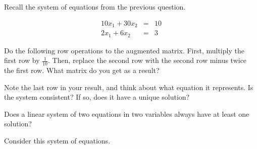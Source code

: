





Recall the system of equations from the previous question.  



\begin{eqnarray*}
10x_1 + 30x_2 & = & 10 \\
2x_1 + 6x_2 & = & 3 
\end{eqnarray*}





Do the following row operations to the augmented matrix.  First, multiply the first row by 
$\frac{1}{10}$.   Then, replace the second row with the second
row minus twice the first row.  What matrix do you get as a result?  




\edXsolution{ 


}

\endedxproblem




Note the last row in your result, and think about what equation it represents.  
Is the system consistent?  If so, does it have a unique solution?  



\endedxproblem


Does a linear system of two equations in two variables always have at least one solution?


\edXsolution{  }

\endedxproblem






Consider this system of equations.  



